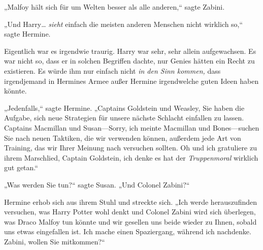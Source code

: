 „Malfoy hält sich für um Welten besser als alle anderen,“ sagte Zabini.

„Und Harry… \emph{sieht} einfach die meisten anderen Menschen nicht wirklich so,“ sagte Hermine.

Eigentlich war es irgendwie traurig. Harry war sehr, sehr allein aufgewachsen. Es war nicht so, dass er in solchen Begriffen dachte, nur Genies hätten ein Recht zu existieren. Es würde ihm nur einfach nicht \emph{in den Sinn kommen,} dass irgendjemand in Hermines Armee außer Hermine irgendwelche guten Ideen haben könnte.

„Jedenfalls,“ sagte Hermine. „Captains Goldstein und Weasley, Sie haben die Aufgabe, sich neue Strategien für unsere nächste Schlacht einfallen zu lassen. Captains Macmillan und Susan—Sorry, ich meinte Macmillan und Bones—suchen Sie nach neuen Taktiken, die wir verwenden können, außerdem jede Art von Training, das wir Ihrer Meinung nach versuchen sollten. Oh und ich gratuliere zu ihrem Marschlied, Captain Goldstein, ich denke es hat der \emph{Truppenmoral} wirklich gut getan.“

„Was werden Sie tun?“ sagte Susan. „Und Colonel Zabini?“

Hermine erhob sich aus ihrem Stuhl und streckte sich. „Ich werde herauszufinden versuchen, was Harry Potter wohl denkt und Colonel Zabini wird sich überlegen, was Draco Malfoy tun könnte und wir gesellen uns beide wieder zu Ihnen, sobald uns etwas eingefallen ist. Ich mache einen Spaziergang, während ich nachdenke. Zabini, wollen Sie mitkommen?“

